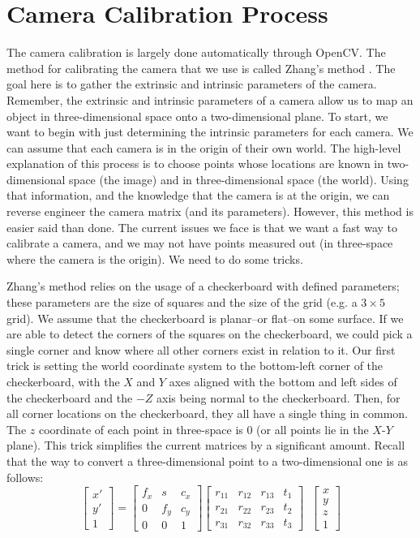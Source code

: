 \documentclass[
    12pt,
    twoside,
    bibstyle=chicago,
    headerstyle=uppercase,
	bibfile=thesis_updating.bib
]{reedthesis}
\begin{document}
\section{Camera Calibration Process}
The camera calibration is largely done automatically through OpenCV. The method for calibrating the camera that we use is called Zhang's method \autocite{zhangFlexibleNewTechnique2000a}. The goal here is to gather the extrinsic and intrinsic parameters of the camera. Remember, the extrinsic and intrinsic parameters of a camera allow us to map an object in three-dimensional space onto a two-dimensional plane. To start, we want to begin with just determining the intrinsic parameters for each camera. We can assume that each camera is in the origin of their own world. The high-level explanation of this process is to choose points whose locations are known in two-dimensional space (the image) and in three-dimensional space (the world). Using that information, and the knowledge that the camera is at the origin, we can reverse engineer the camera matrix (and its parameters). However, this method is easier said than done. The current issues we face is that we want a fast way to calibrate a camera, and we may not have points measured out (in three-space where the camera is the origin). We need to do some tricks.

Zhang's method relies on the usage of a checkerboard with defined parameters; these parameters are the size of squares and the size of the grid (e.g. a $3\times5$ grid). We assume that the checkerboard is planar--or flat--on some surface. If we are able to detect the corners of the squares on the checkerboard, we could pick a single corner and know where all other corners exist in relation to it. Our first trick is setting the world coordinate system to the bottom-left corner of the checkerboard, with the $X$ and $Y$ axes aligned with the bottom and left sides of the checkerboard and the $-Z$ axis being normal to the checkerboard. Then, for all corner locations on the checkerboard, they all have a single thing in common. The $z$ coordinate of each point in three-space is 0 (or all points lie in the $X$-$Y$ plane). This trick simplifies the current matrices by a significant amount. Recall that the way to convert a three-dimensional point to a two-dimensional one is as follows:
\[\begin{bmatrix}x' \\ y' \\ 1\end{bmatrix} = \begin{bmatrix}f_x & s & c_x \\ 0 & f_y & c_y \\ 0 & 0 & 1\end{bmatrix} \begin{bmatrix} r_{11}&r_{12}&r_{13}&t_{1}\\r_{21}&r_{22}&r_{23}&t_{2}\\r_{31}&r_{32}&r_{33}&t_{3}\end{bmatrix}\;\;\begin{bmatrix}x \\ y \\ z \\ 1\end{bmatrix}\]
\end{document}

